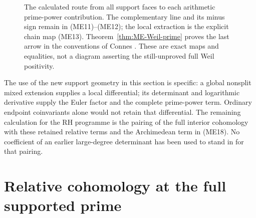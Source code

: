 \documentclass[11pt,a4paper]{article}
\theoremstyle{definition}\newtheorem{definition}[theorem]{Definition}
\newcommand{\C}{\mathbb C}\newcommand{\R}{\mathbb R}
\begin{document}
\begin{figure}[ht]
\centering
{}
\caption{The calculated route from all support faces to each arithmetic
prime-power contribution. The complementary line and its minus sign remain
in (ME11)--(ME12); the local extraction is the explicit chain map (ME13).
Theorem~\ref{thm:ME-Weil-prime} proves the last arrow in the conventions of
Connes \cite{Connes1998,Connes2026}. These are exact maps and equalities,
not a diagram asserting the still-unproved full Weil positivity.}
\end{figure}

The use of the new support geometry in this section is specific: a global
nonsplit mixed extension supplies a local differential; its determinant
and logarithmic derivative supply the Euler factor and the complete
prime-power term. Ordinary endpoint coinvariants alone would not retain
that differential. The remaining calculation for the RH programme is the
pairing of the full interior cohomology with these retained relative terms
and the Archimedean term in (ME18). No coefficient of an earlier large-degree
determinant has been used to stand in for that pairing.

\section{Relative cohomology at the full supported prime}\label{sec:relative-prime-recollement}
\end{document}
